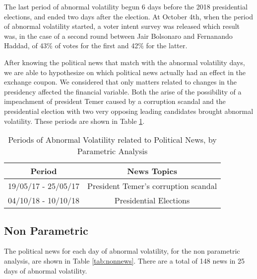 \documentclass[a4paper]{article}
\begin{document}
The last period of abnormal volatility begun 6 days before the 2018 presidential elections, and ended two days after the election. At October 4th, when the period of abnormal volatility started, a voter intent survey was released which result was, in the case of a second round between Jair Bolsonaro and Fernanando Haddad, of 43\% of votes for the first and 42\% for the latter. 

After knowing the political news that match with the abnormal volatility days, we are able to hypothesize on which political news actually had an effect in the exchange coupon. We considered that only matters related to changes in the presidency affected the financial variable. Both the arise of the possibility of a impeachment of president Temer caused by a corruption scandal and the presidential election with two very opposing leading candidates brought abnormal volatility. These periods are shown in Table \ref{tab:respar}.

\begin{table}[H]
\caption{Periods of Abnormal Volatility related to Political News, by Parametric Analysis}
\label{tab:respar}
\centering
\begin{tabular}{| c | c |}
\hline
Period & News Topics \\
\hline \hline
19/05/17 - 25/05/17 & President Temer's corruption scandal \\
\hline
04/10/18 - 10/10/18 & Presidential Elections \\
\hline
\end{tabular}
\end{table}


\subsection{Non Parametric}

The political news for each day of abnormal volatility, for the non parametric analysis, are shown in Table \ref{tab:nonnews}. There are a total of 148 news in 25 days of abnormal volatility.


\end{document}
